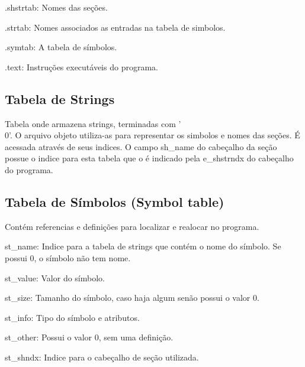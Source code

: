    .shstrtab: Nomes das seções.

   .strtab: Nomes associados as entradas na tabela de simbolos.

   .symtab: A tabela de símbolos.

   .text: Instruções executáveis do programa.

\subsection {Tabela de Strings}
   Tabela onde armazena strings, terminadas com '\\0'. O arquivo objeto utiliza-as para representar os simbolos e nomes das seções. É acessada através de seus indices. O campo sh\_name do cabeçalho da seção possue o indice para esta tabela que o é indicado pela e\_shstrndx do cabeçalho do programa.
\subsection {Tabela de Símbolos (Symbol table)}
   Contém referencias e definições para localizar e realocar no programa.
   
   st\_name: Indice para a tabela de strings que contém o nome do símbolo. Se possui 0, o símbolo não tem nome.

   st\_value: Valor do símbolo.

   st\_size: Tamanho do símbolo, caso haja algum senão possui o valor 0.

   st\_info: Tipo do símbolo e atributos.

   st\_other: Possui o valor 0, sem uma definição.
   
   st\_shndx: Indice para o cabeçalho de seção utilizada.
